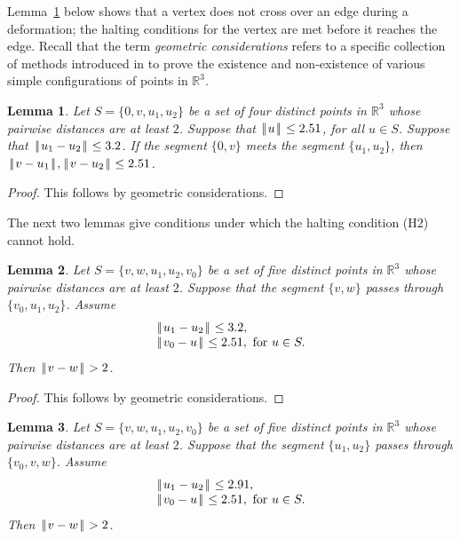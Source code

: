 \documentclass[11pt]{amsart}
\newcommand{\ring}[1]{\mathbb{#1}}
\def\text{\hbox}
\def\|{{\hskip0.1em|\hskip-0.15em|\hskip0.1em}}
\newtheorem{lemma}{Lemma}
\begin{document}
Lemma~\ref{lemma:1} below shows that a vertex does not cross over an edge during a deformation; the halting conditions for the vertex are met before it reaches the edge.  Recall that the term {\it geometric considerations} refers to a specific collection of methods introduced in \cite[\S4.2]{Hales:2006:DCG} to prove the existence and non-existence of various simple configurations of points in $\ring{R}^3$.

\begin{lemma}\label{lemma:1} Let $S=\{0,v,u_1,u_2\}$ be a set of four distinct points in $\ring{R}^3$ whose pairwise distances are at least $2$.  Suppose that $\|u\|\le 2.51$, for all $u\in S$.  Suppose that $\|u_1-u_2\|\le 3.2$. If the segment $\{0,v\}$ meets the segment $\{u_1,u_2\}$, then $\|v-u_1\|,\|v-u_2\|\le 2.51$.
\end{lemma}

\begin{proof} This follows by geometric considerations.
\end{proof}

The next two lemmas give conditions under which the halting condition (H2) cannot hold.

\begin{lemma}\label{lemma:prelim}  Let $S=\{v,w,u_1,u_2,v_0\}$ be a set of five distinct points in $\ring{R}^3$ whose
pairwise distances are at least $2$. Suppose that the segment $\{v,w\}$ passes through
$\{v_0,u_1,u_2\}$. Assume
$$
\begin{array}{lll}
\|u_1-u_2\|\le 3.2,\\
\|v_0-u\|\le 2.51,\text{ for } u \in S.\\
\end{array}
$$
Then $\|v-w\|>2$.
\end{lemma}

\begin{proof} This follows by geometric considerations.
\end{proof}

\begin{lemma}\label{lemma:291}  Let $S=\{v,w,u_1,u_2,v_0\}$ be a set of five distinct points in $\ring{R}^3$ whose
pairwise distances are at least $2$. Suppose that the segment $\{u_1,u_2\}$ passes through
$\{v_0,v,w\}$. Assume
$$
\begin{array}{lll}
\|u_1-u_2\|\le 2.91,\\
\|v_0-u\|\le 2.51,\text{ for } u \in S.\\
\end{array}
$$
Then $\|v-w\|>2$.
\end{lemma}
\end{document}
